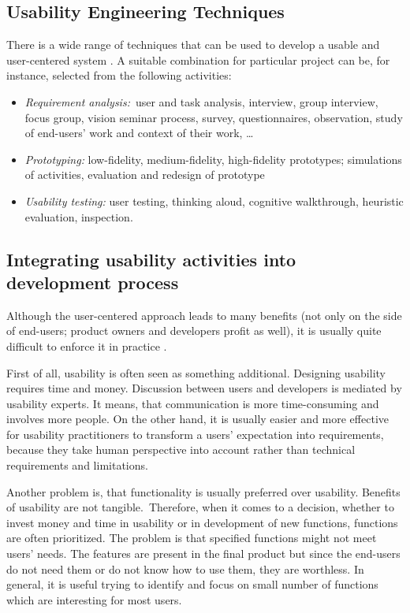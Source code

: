 \documentclass[graybox]{svmult}
\begin{document}
\subsection{Usability Engineering Techniques}
There is a wide range of techniques that can be used to develop a usable and
user-centered system \cite{allen1996information,de1998wsdm,norman1986user}. A
suitable combination for particular project can be, for instance, selected
from the following activities:
\begin{itemize}
\item \emph{Requirement analysis:} user and task analysis, interview, group
interview, focus group, vision seminar process, survey, questionnaires,
observation, study of end-users' work and context of their work, \ldots
\item \emph{Prototyping:} low-fidelity, medium-fidelity, high-fidelity
prototypes; simulations of activities, evaluation and redesign of prototype
\item \emph{Usability testing:} user testing, thinking aloud, cognitive
walkthrough, heuristic evaluation, inspection.
\end{itemize}

\subsection{Integrating usability activities into development process}
Although the user-centered approach leads to many benefits (not only on the
side of end-users; product owners and developers profit as well), it is
usually quite difficult to enforce it in practice \cite{olson1991user}.

First of all, usability is often seen as something additional. Designing
usability requires time and money. Discussion between users and developers is
mediated by usability experts. It means, that communication is more
time-consuming and involves more people. On the other hand, it is usually
easier and more effective for usability practitioners to transform a users'
expectation into requirements, because they take human perspective into
account rather than technical requirements and limitations.

Another problem is, that functionality is usually preferred over usability.
Benefits of usability are not tangible. Therefore, when it comes to a decision,
whether to invest money and time in usability or in development of new
functions, functions are often prioritized. The problem is that specified
functions might not meet users' needs. The features are present in the final
product but since the end-users do not need them or do not know how to use
them, they are worthless. In general, it is useful trying to identify and
focus on small number of functions which are interesting for most users.
\end{document}
